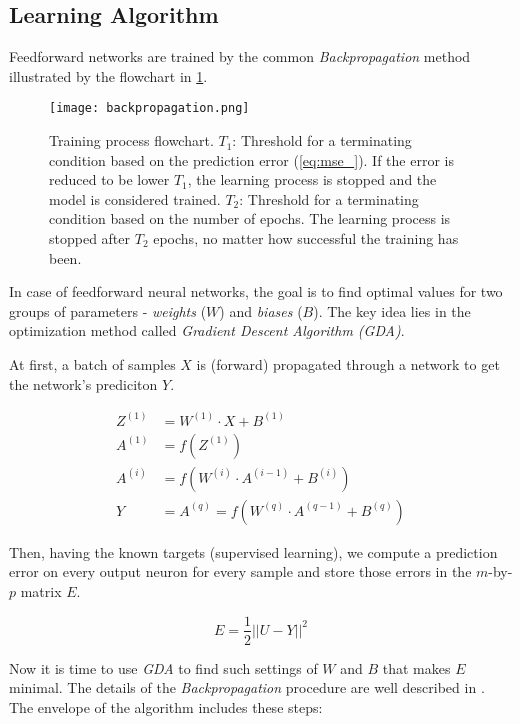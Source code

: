 \subsection*{Learning Algorithm}
Feedforward networks are trained by the common \textit{Backpropagation} method illustrated by the flowchart in \cref{fig:methods:backpropagation}.

\begin{figure}[H]
  \centering
  \texttt{[image: backpropagation.png]}
  \caption{Training process flowchart. $ T_1 $: Threshold for a terminating condition based on the prediction error (\cref{eq:mse_}). If the error is reduced to be lower $ T_1 $, the learning process is stopped and the model is considered trained. $ T_2 $: Threshold for a terminating condition based on the number of epochs. The learning process is stopped after $ T_2 $ epochs, no matter how successful the training has been.}
  \label{fig:methods:backpropagation}
\end{figure}

In case of feedforward neural networks, the goal is to find optimal values for two groups of parameters - \textit{weights} ($ W $) and \textit{biases} ($ B $). The key idea lies in the optimization method called \textit{Gradient Descent Algorithm (GDA)}.

At first, a batch of samples $ X $ is (forward) propagated through a network to get the network's prediciton $ Y $.

\begin{align}
Z^{(1)} &= W^{(1)} \cdot X + B^{(1)} \\
A^{(1)} &= f(Z^{(1)}) \\
A^{(i)} &= f(W^{(i)} \cdot A^{(i-1)} + B^{(i)}) \\
Y &= A^{(q)} = f(W^{(q)} \cdot A^{(q-1)} + B^{(q)})
\end{align}

Then, having the known targets (supervised learning), we compute a prediction error on every output neuron for every sample and store those errors in the $ m $-by-$ p $ matrix $ E $.

\begin{equation} \label{eq:prediction_error}
E = \frac{1}{2} ||U - Y||^2
\end{equation}

Now it is time to use \textit{GDA} to find such settings of $ W $ and $ B $ that makes $ E $ minimal. The details of the \textit{Backpropagation} procedure are well described in \citep{online:nnanddl}. The envelope of the algorithm includes these steps:

